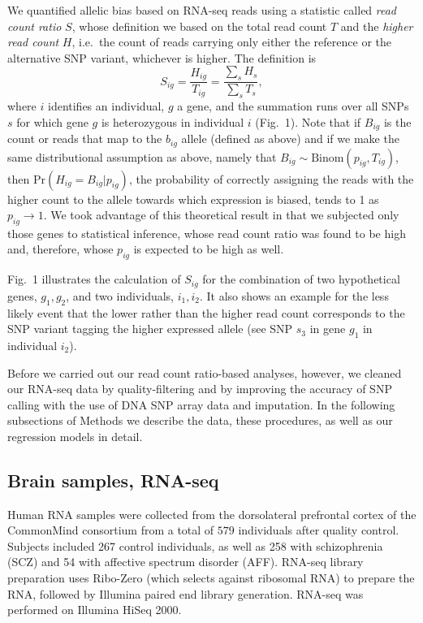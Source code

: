 \documentclass[letterpaper]{article}
\begin{document}
We quantified allelic bias based on RNA-seq reads using a statistic called
\emph{read count ratio} \(S\), whose definition we
based on the total read count \(T\) and the \emph{higher read count} \(H\),
i.e.~the count of reads carrying only either the reference or the alternative SNP variant,
whichever is higher.  The
definition is
\begin{equation}
S_{ig} = \frac{H_{ig}}{T_{ig}}= \frac{\sum_s H_s}{\sum_sT_s},
\label{eq:S-definition}
\end{equation}
where \(i\) identifies an individual, \(g\) a gene, and the summation runs
over all SNPs \(s\) for which gene \(g\) is heterozygous in individual \(i\) (Fig.~1).
Note that if \(B_{ig}\) is the count or reads that map to the \(b_{ig}\) allele
(defined as above) and if we make the same distributional assumption as above, namely that \(B_{ig}\sim
\mathrm{Binom}(p_{ig}, T_{ig})\), then \(\mathrm{Pr}(H_{ig}=B_{ig}|p_{ig})\), the probability of correctly
assigning the reads with the higher count to the allele towards which
expression is biased, tends to 1 as \(p_{ig} \rightarrow 1\).  We took
advantage of this theoretical result in that we subjected only those genes to
statistical inference, whose read count ratio was found to be high and,
therefore, whose \(p_{ig}\) is expected to be high as well.

Fig.~1 illustrates the calculation of \(S_{ig}\) for the
combination of two hypothetical genes, \(g_1,g_2\), and two individuals,
\(i_1,i_2\).  It also shows an example for the less likely event that the lower rather
than the higher read count corresponds to the SNP variant tagging the higher
expressed allele (see SNP \(s_3\) in gene \(g_1\) in individual \(i_2\)).

Before we carried out our read count ratio-based analyses, however, we cleaned
our RNA-seq data by quality-filtering and by improving the accuracy of SNP
calling with the use of DNA SNP array data and imputation. In the following
subsections of Methods we describe the data, these procedures, as well as our
regression models in detail.

\subsection*{Brain samples, RNA-seq}

Human RNA samples were collected from the dorsolateral prefrontal cortex of
the CommonMind consortium from a total of \(579\) individuals after
quality control. Subjects included 267 control individuals, as well as 258
with schizophrenia (SCZ) and 54 with affective spectrum disorder (AFF).
RNA-seq library preparation uses Ribo-Zero (which selects against ribosomal
RNA) to prepare the RNA, followed by Illumina paired end library generation.
RNA-seq was performed on Illumina HiSeq 2000.
\end{document}
